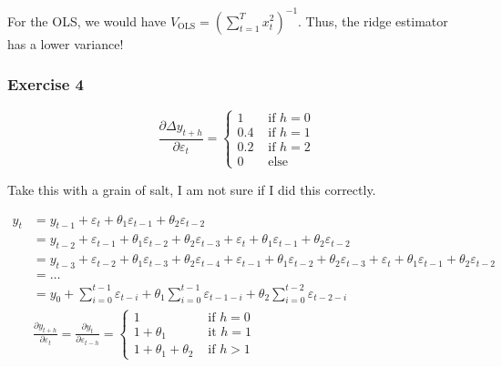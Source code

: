{{\begin{enumerate}[label=(\alph*)]
{For the OLS, we would have $V_{\text{OLS}}=\left(\sum_{t=1}^{T} x_{t}^{2}\right)^{-1}$.
Thus, the ridge estimator has a lower variance!
}
\end{enumerate}
}
{
\subsubsection*{Exercise 4}

\begin{enumerate}[label=(\alph*)]
{\item 
$$
\frac{\partial \Delta y_{t+h}}{\partial \varepsilon_{t}}= \begin{cases}1 & \text { if } h=0 \\ 0.4 & \text { if } h=1 \\ 0.2 & \text { if } h=2 \\ 0 & \text { else }\end{cases}
$$
}
{\item \color{red} Take this with a grain of salt, I am not sure if I did this correctly. \color{black}

$$
\begin{aligned}
y_{t} &=y_{t-1}+\varepsilon_{t}+\theta_{1} \varepsilon_{t-1}+\theta_{2} \varepsilon_{t-2} \\
& =y_{t-2}+\varepsilon_{t-1}+\theta_{1} \varepsilon_{t-2}+\theta_{2} \varepsilon_{t-3} +\varepsilon_{t}+\theta_{1} \varepsilon_{t-1}+\theta_{2} \varepsilon_{t-2} \\
& =y_{t-3}+\varepsilon_{t-2}+\theta_{1} \varepsilon_{t-3}+\theta_{2} \varepsilon_{t-4} +\varepsilon_{t-1}+\theta_{1} \varepsilon_{t-2}+\theta_{2} \varepsilon_{t-3} +\varepsilon_{t}+\theta_{1} \varepsilon_{t-1}+\theta_{2} \varepsilon_{t-2} \\
& =\ldots \\
& =y_{0}+\sum_{i=0}^{t-1} \varepsilon_{t-i}+\theta_{1} \sum_{i=0}^{t-1} \varepsilon_{t-1-i}+\theta_{2} \sum_{i=0}^{t-2} \varepsilon_{t-2-i} \\
& \frac{\partial y_{t+h}}{\partial \varepsilon_{t}}=\frac{\partial y_{t}}{\partial \varepsilon_{t-h}}= \begin{cases}1 & \text { if } h=0 \\
1+\theta_{1} & \text { it } h=1 \\
1+\theta_{1}+\theta_{2} & \text { if } h>1\end{cases}
\end{aligned}
$$
}
\end{enumerate}
}
}

